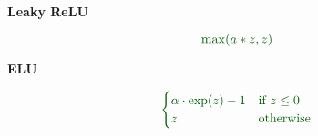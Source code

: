 \vspace{0.7cm}
\begin{minipage}{0.5\textwidth}
\vspace{-0.3cm}
{\begin{center}
\Large{\inconsolatafontfamily \textbf{\textcolor{mygreen!60!black}{Leaky ReLU}}}\end{center}}
\vspace{-0.7cm}
{\Large
\begin{ceqn}
\begin{equation*}
\textcolor{mygreen!60!black}{\max(a*z,z)}
\end{equation*}
\end{ceqn}
}
\end{minipage}
\begin{minipage}{0.5\textwidth}
{\begin{center}
\Large{\inconsolatafontfamily \textbf{\textcolor{mygreen!60!black}{ELU}}}\end{center}}
\vspace{-0.7cm}
{\Large
\begin{ceqn}
\begin{equation*}
\textcolor{mygreen!60!black}{\begin{cases}
\alpha \cdot \exp(z) - 1 & \text{if } z \leq 0 \\
z & \text{otherwise}
\end{cases}}
\end{equation*}
\end{ceqn}
}
\end{minipage}

